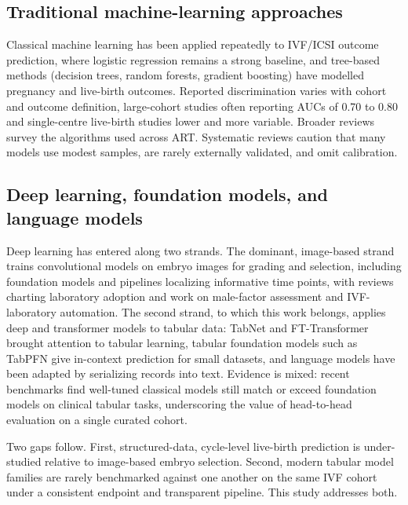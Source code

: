 \documentclass[12pt,a4paper]{article}
\begin{document}
\subsection*{Traditional machine-learning approaches}

Classical machine learning has been applied repeatedly to IVF/ICSI outcome prediction, where logistic regression remains a strong baseline,\cite{liu,goyal} and tree-based methods (decision trees, random forests, gradient boosting) have modelled pregnancy and live-birth outcomes.\cite{fu,bai,hassan} Reported discrimination varies with cohort and outcome definition, large-cohort studies often reporting AUCs of 0.70 to 0.80\cite{goyal,huang} and single-centre live-birth studies lower and more variable. Broader reviews survey the algorithms used across ART.\cite{ranjini,raef,kim} Systematic reviews caution that many models use modest samples, are rarely externally validated, and omit calibration.\cite{henderson,ratna,andaur,wu}

\subsection*{Deep learning, foundation models, and language models}

Deep learning has entered along two strands. The dominant, image-based strand trains convolutional models on embryo images for grading and selection,\cite{theilgaard,louis,huang,delestro} including foundation models\cite{femi} and pipelines localizing informative time points,\cite{dlPipeline,dlEmbryoSel} with reviews charting laboratory adoption\cite{riegler,hew,salih} and work on male-factor assessment\cite{qaderi} and IVF-laboratory automation.\cite{fernandez,siristatidis} The second strand, to which this work belongs, applies deep and transformer models to tabular data: TabNet and FT-Transformer brought attention to tabular learning,\cite{tabnet,fttrans} tabular foundation models such as TabPFN give in-context prediction for small datasets,\cite{tabpfnIclr,tabpfnNat} and language models have been adapted by serializing records into text.\cite{tabllm} Evidence is mixed: recent benchmarks find well-tuned classical models still match or exceed foundation models on clinical tabular tasks,\cite{benchmark} underscoring the value of head-to-head evaluation on a single curated cohort.

Two gaps follow. First, structured-data, cycle-level live-birth prediction is under-studied relative to image-based embryo selection. Second, modern tabular model families are rarely benchmarked against one another on the same IVF cohort under a consistent endpoint and transparent pipeline. This study addresses both.
\end{document}
